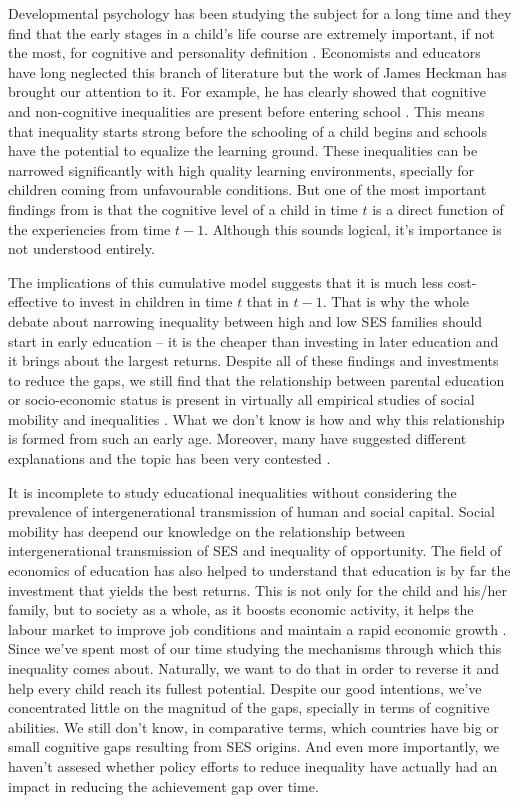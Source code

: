 \documentclass[11pt, a4paper]{article}\usepackage[]{graphicx}\usepackage[]{color}
\begin{document}
Developmental psychology has been studying the subject for a long time and they find that the early stages in a child's life course are extremely important, if not the most, for cognitive and personality definition \citep{duyme1999, waldfogel2006}. Economists and educators have long neglected this branch of literature but the work of James Heckman has brought our attention to it. For example, he has clearly showed that cognitive and non-cognitive inequalities are present before entering school \citep{heckman2006}. This means that inequality starts strong before the schooling of a child begins and schools have the potential to equalize the learning ground. These inequalities can be narrowed significantly with high quality learning environments, specially for children coming from unfavourable conditions. But one of the most important findings from \citet{cunha2006} is that the cognitive level of a child in time \(t\) is a direct function of the experiencies from time \(t-1\). Although this sounds logical, it's importance is not understood entirely.

The implications of this cumulative model suggests that it is much less cost-effective to invest in children in time \(t\) that in \(t-1\). That is why the whole debate about narrowing inequality between high and low SES families should start in early education -- it is the cheaper than investing in later education and it brings about the largest returns. Despite all of these findings and investments to reduce the gaps, we still find that the relationship between parental education or socio-economic status is present in virtually all empirical studies of social mobility and inequalities \citep{breen1997, breen2007, waldfogel2006, bradbury2015, chetty2016}. What we don't know is how and why this relationship is formed from such an early age. Moreover, many have suggested different explanations and the topic has been very contested \citep{brooks1997}.

It is incomplete to study educational inequalities without considering the prevalence of intergenerational transmission of human and social capital. Social mobility has deepend our knowledge on the relationship between intergenerational transmission of SES and inequality of opportunity. The field of economics of education has also helped to understand that education is by far the investment that yields the best returns. This is not only for the child and his/her family, but to society as a whole, as it boosts economic activity, it helps the labour market to improve job conditions and maintain a rapid economic growth \citep{hanushek2007}. Since \citet{coleman1966} we've spent most of our time studying the mechanisms through which this inequality comes about. Naturally, we want to do that in order to reverse it and help every child reach its fullest potential. Despite our good intentions, we've concentrated little on the magnitud of the gaps, specially in terms of cognitive abilities. We still don't know, in comparative terms, which countries have big or small cognitive gaps resulting from SES origins. And even more importantly, we haven't assesed whether policy efforts to reduce inequality have actually had an impact in reducing the achievement gap over time.
\end{document}
